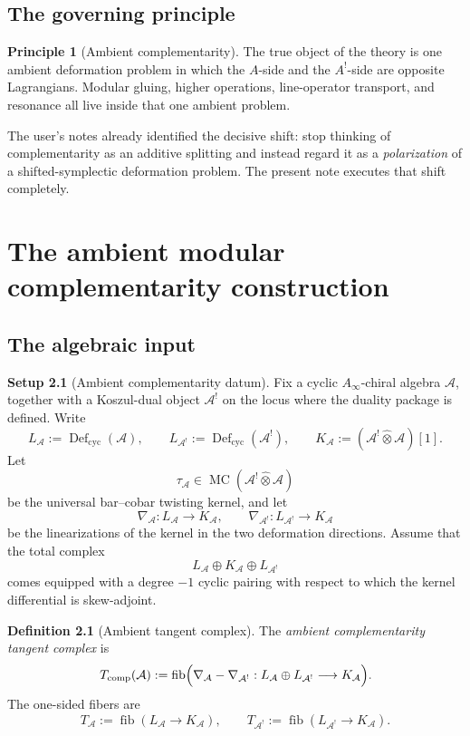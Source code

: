\documentclass[11pt,oneside]{memoir}
\numberwithin{equation}{chapter}
\theoremstyle{definition}
\newtheorem{definition}[theorem]{Definition}
\newtheorem{setup}[theorem]{Setup}
\newtheorem{principle}[theorem]{Principle}
\newcommand{\cA}{\mathcal A}
\newcommand{\hot}{\widehat\otimes}
\newcommand{\Defcyc}{\operatorname{Def}_{\mathrm{cyc}}}
\newcommand{\MC}{\operatorname{MC}}
\newcommand{\Fib}{\operatorname{fib}}
\newcommand{\Ainf}{A_{\infty}}
\begin{document}
\section{The governing principle}

\begin{principle}[Ambient complementarity]
The true object of the theory is one ambient deformation problem in which the \(A\)-side and the \(A^!\)-side are opposite Lagrangians.  Modular gluing, higher operations, line-operator transport, and resonance all live inside that one ambient problem.
\end{principle}

The user's notes already identified the decisive shift: stop thinking of complementarity as an additive splitting and instead regard it as a \emph{polarization} of a shifted-symplectic deformation problem.  The present note executes that shift completely.

\chapter{The ambient modular complementarity construction}
\label{chap:ambient-master-construction}

\section{The algebraic input}

\begin{setup}[Ambient complementarity datum]
\label{setup:ambient-datum}
Fix a cyclic \(\Ainf\)-chiral algebra \(\cA\), together with a Koszul-dual object \(\cA^!\) on the locus where the duality package is defined.  Write
\[
L_{\cA}:=\Defcyc(\cA),
\qquad
L_{\cA^!}:=\Defcyc(\cA^!),
\qquad
K_{\cA}:=(\cA^!\hot \cA)[1].
\]
Let
\[
\tau_{\cA}\in \MC(\cA^!\hot \cA)
\]
be the universal bar--cobar twisting kernel, and let
\[
\nabla_{\cA}:L_{\cA}\to K_{\cA},
\qquad
\nabla_{\cA^!}:L_{\cA^!}\to K_{\cA}
\]
be the linearizations of the kernel in the two deformation directions.  Assume that the total complex
\[
L_{\cA}\oplus K_{\cA}\oplus L_{\cA^!}
\]
comes equipped with a degree \(-1\) cyclic pairing with respect to which the kernel differential is skew-adjoint.
\end{setup}

\begin{definition}[Ambient tangent complex]
\label{def:ambient-tangent}
The \emph{ambient complementarity tangent complex} is
\begin{equation}
\label{eq:ambient-tangent-complex}
T_{\mathrm{comp}}(\cA)
:=
\Fib\Bigl(
\nabla_{\cA}-\nabla_{\cA^!}:L_{\cA}\oplus L_{\cA^!}\longrightarrow K_{\cA}
\Bigr).
\end{equation}
The one-sided fibers are
\[
T_{\cA}:=\Fib(L_{\cA}\to K_{\cA}),
\qquad
T_{\cA^!}:=\Fib(L_{\cA^!}\to K_{\cA}).
\]
\end{definition}
\end{document}
